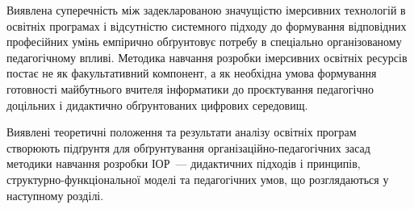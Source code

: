 Виявлена суперечність між задекларованою значущістю імерсивних технологій в освітніх програмах і відсутністю системного підходу до формування відповідних професійних умінь емпірично обґрунтовує потребу в спеціально організованому педагогічному впливі. Методика навчання розробки імерсивних освітніх ресурсів постає не як факультативний компонент, а як необхідна умова формування готовності майбутнього вчителя інформатики до проєктування педагогічно доцільних і дидактично обґрунтованих цифрових середовищ.

Виявлені теоретичні положення та результати аналізу освітніх програм створюють підґрунтя для обґрунтування організаційно-педагогічних засад методики навчання розробки ІОР~--- дидактичних підходів і принципів, структурно-функціональної моделі та педагогічних умов, що розглядаються у наступному розділі.

